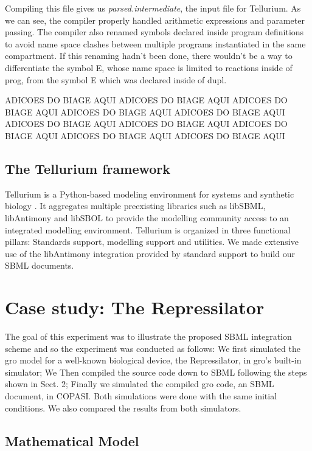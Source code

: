 \documentclass[12pt]{article}
\begin{document}
    
    
    Compiling this file gives us \textit{parsed.intermediate}, the input file for Tellurium. As we can see, the compiler properly handled arithmetic expressions and parameter passing. The compiler also renamed symbols declared inside program definitions to avoid name space clashes between multiple programs instantiated in the same compartment. If this renaming hadn't been done, there wouldn't be a way to differentiate the symbol E, whose name space is limited to reactions inside of prog, from the symbol E which was declared inside of dupl.
    
    ADICOES DO BIAGE AQUI ADICOES DO BIAGE AQUI ADICOES DO BIAGE AQUI ADICOES DO BIAGE AQUI ADICOES DO BIAGE AQUI ADICOES DO BIAGE AQUI ADICOES DO BIAGE AQUI ADICOES DO BIAGE AQUI ADICOES DO BIAGE AQUI ADICOES DO BIAGE AQUI
    
    
    
\subsection{The Tellurium framework}

    Tellurium is a Python-based modeling environment for systems and synthetic biology \cite{Choi2018}. It aggregates multiple preexisting libraries such as libSBML, libAntimony and libSBOL to provide the modelling community access to an integrated modelling environment. Tellurium is organized in three functional pillars: Standards support, modelling support and utilities. We made extensive use of the libAntimony integration provided by standard support to build our SBML documents.


\section{Case study: The Repressilator}


    The goal of this experiment was to illustrate the proposed SBML integration scheme and so the experiment was conducted as follows: We first simulated the gro model for a well-known biological device, the Repressilator, in gro's built-in simulator; We Then compiled the source code down to SBML following the steps shown in Sect. 2; Finally we simulated the compiled gro code, an SBML document, in COPASI. Both simulations were done with the same initial conditions. We also compared the results from both simulators.


\subsection{Mathematical Model}
\end{document}
